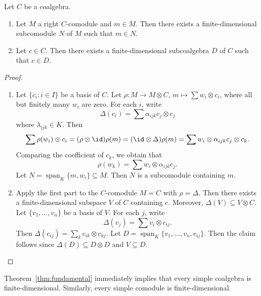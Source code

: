 \documentclass[12pt]{amsproc}
\begin{document}
\begin{theorem}
\label{thm:fundamental}
    Let $C$ be a coalgebra.
    \begin{enumerate}
        \item Let $M$ a right $C$-comodule and 
    $m\in M$. Then there exists a finite-dimensional
    subcomodule $N$ of $M$ such that $m\in N$. 
        \item Let $c\in C$. Then there exists a finite-dimensional subcoalgebra $D$ of
        $C$ such that $c\in D$. 
    \end{enumerate}
\end{theorem}

\begin{proof}\
    \begin{enumerate}
            \item Let $\{c_i:i\in I\}$ be a basis of $C$. Let $\rho\colon M\to M\otimes C$, $m\mapsto\sum w_i\otimes c_i$, where all but finitely many $w_i$ are
            zero. For each $i$, write 
            \[
            \Delta(c_i)=\sum\alpha_{ijk}c_j\otimes c_j
            \]
            where $\lambda_{ijk}\in K$. Then
            \begin{align*}
                \sum\rho(w_i)\otimes c_i
                =(\rho\otimes\id)\rho(m)
                =(\id\otimes\Delta)\rho(m)
                =\sum w_i\otimes\alpha_{ijk}c_j\otimes c_k.
            \end{align*}
            Comparing the coefficient of $c_k$, we obtain that
            \[
            \rho(w_k)=\sum w_i\otimes\alpha_{ijk}c_j.
            \]
            Let $N=\operatorname{span}_K\{m,w_i\}\subseteq M$. 
            Then $N$ is a subcomodule containing $m$. 
        \item Apply the first part to the $C$-comodule 
        $M=C$ with $\rho=\Delta$. Then there exists 
        a finite-dimensional subspace $V$ of $C$ containing $c$. 
        Moreover, $\Delta(V)\subseteq V\otimes C$. Let $\{v_1,\dots,v_n\}$ be a basis of $V$. For each $j$, write
        \[
        \Delta(v_j)=\sum v_i\otimes c_{ij}. 
        \]
        Then $\Delta(c_{ij})=\sum_kc_{ik}\otimes c_{kj}$. Let 
        $D=\operatorname{span}_K\{v_1,\dots,v_n,c_{ij}\}$. Then the claim follows since 
        $\Delta(D)\subseteq D\otimes D$ and $V\subseteq D$.\qedhere 
    \end{enumerate}
\end{proof}

Theorem~\ref{thm:fundamental} immediately implies that every simple coalgebra is finite-dimensional. Similarly, every simple comodule is finite-dimensional.
\end{document}

